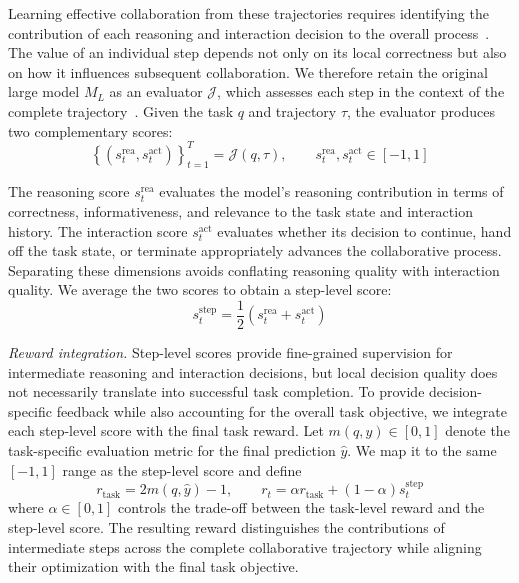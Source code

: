 \documentclass{article} %
\begin{document}
Learning effective collaboration from these trajectories requires identifying the contribution of each reasoning and interaction decision to the overall process~\citep{foerster2018coma}. The value of an individual step depends not only on its local correctness but also on how it influences subsequent collaboration. We therefore retain the original large model $M_L$ as an evaluator $\mathcal{J}$, which assesses each step in the context of the complete trajectory~\citep{zhuge2025agentjudge}. Given the task $q$ and trajectory $\tau$, the evaluator produces two complementary scores:
\begin{equation}
    \left\{
    \left(
    s_t^{\mathrm{rea}},
    s_t^{\mathrm{act}}
    \right)
    \right\}_{t=1}^{T}
    =
    \mathcal{J}(q,\tau),
    \qquad
    s_t^{\mathrm{rea}},s_t^{\mathrm{act}}\in[-1,1]
\end{equation}

The reasoning score $s_t^{\mathrm{rea}}$ evaluates the model's reasoning contribution in terms of correctness, informativeness, and relevance to the task state and interaction history. The interaction score $s_t^{\mathrm{act}}$ evaluates whether its decision to continue, hand off the task state, or terminate appropriately advances the collaborative process. Separating these dimensions avoids conflating reasoning quality with interaction quality. We average the two scores to obtain a step-level score:
\begin{equation}
    s_t^{\mathrm{step}}
    =
    \frac{1}{2}
    \left(
    s_t^{\mathrm{rea}}
    +
    s_t^{\mathrm{act}}
    \right)
\end{equation}
\vspace{-1em}

\noindent\textit{Reward integration.}\quad
Step-level scores provide fine-grained supervision for intermediate reasoning and interaction decisions, but local decision quality does not necessarily translate into successful task completion. To provide decision-specific feedback while also accounting for the overall task objective, we integrate each step-level score with the final task reward. Let $m(q,\hat{y})\in[0,1]$ denote the task-specific evaluation metric for the final prediction $\hat{y}$. We map it to the same $[-1,1]$ range as the step-level score and define
\begin{equation}
    r_{\mathrm{task}}
    =
    2m(q,\hat{y})-1,
    \qquad
    r_t
    =
    \alpha r_{\mathrm{task}}
    +
    (1-\alpha)s_t^{\mathrm{step}}
    \label{eq:step_reward}
\end{equation}
where $\alpha\in[0,1]$ controls the trade-off between the task-level reward and the step-level score. The resulting reward distinguishes the contributions of intermediate steps across the complete collaborative trajectory while aligning their optimization with the final task objective.
\end{document}
